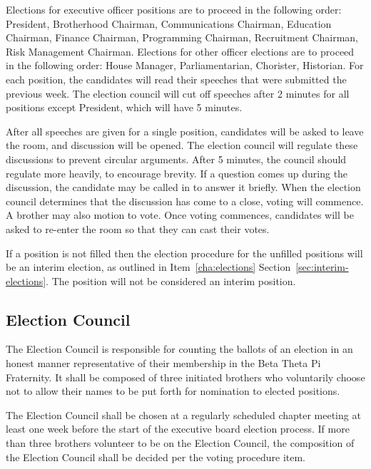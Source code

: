 \label{Election Procedure}
\label{election-procedure}

Elections for executive officer positions are to proceed in the following order:
President, Brotherhood Chairman, Communications Chairman, Education Chairman,
Finance Chairman, Programming Chairman, Recruitment Chairman, Risk Management
Chairman.
Elections for other officer elections are to proceed in the following order:
House Manager, Parliamentarian, Chorister, Historian.
For each position, the candidates will read their speeches that were submitted
the previous week.
The election council will cut off speeches after 2 minutes for all positions
except President, which will have 5 minutes.

After all speeches are given for a single position, candidates will be asked to
leave the room, and discussion will be opened.
The election council will regulate these discussions to prevent circular
arguments.
After 5 minutes, the council should regulate more heavily, to encourage brevity.
If a question comes up during the discussion, the candidate may be called in to
answer it briefly.
When the election council determines that the discussion has come to a close,
voting will commence.
A brother may also motion to vote.
Once voting commences, candidates will be asked to re-enter the room so that
they can cast their votes.

If a position is not filled then the election procedure for the unfilled
positions will be an interim election, as outlined in Item~\ref{cha:elections}
Section~\ref{sec:interim-elections}.
The position will not be considered an interim position.

\subsection{Election Council}
\label{sec:election-council}

The Election Council is responsible for counting the ballots of an election in
an honest manner representative of their membership in the Beta Theta Pi
Fraternity.
It shall be composed of three initiated brothers who voluntarily choose not to
allow their names to be put forth for nomination to elected positions.

The Election Council shall be chosen at a regularly scheduled chapter meeting at
least one week before the start of the executive board election process.
If more than three brothers volunteer to be on the Election Council, the
composition of the Election Council shall be decided per the voting procedure
item.

